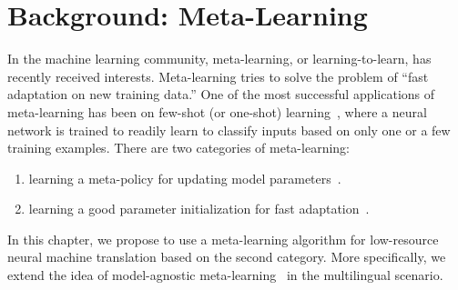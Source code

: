 \section{Background: Meta-Learning}






In the machine learning community, meta-learning, or learning-to-learn, has recently received interests. Meta-learning tries to solve the problem of “fast adaptation on new training data.”  One of the most successful applications of meta-learning has been on few-shot (or one-shot) learning~\citep{lake2015human}, where a neural network is trained to readily learn to classify inputs based on only one or a few training examples. There are two categories of meta-learning:
\begin{enumerate}
    \item learning a meta-policy for updating model parameters~\citep[see, e.g.,][]{andrychowicz2016learning,ha2016hypernetworks,mishra2017meta}.
    \item  learning a good parameter initialization for fast adaptation~\citep[see, e.g.,][]{finn2017model,vinyals2016matching,snell2017prototypical}. 
\end{enumerate}
In this chapter, we propose to use a meta-learning algorithm for low-resource neural machine translation based on the second category. More specifically, we extend the idea of model-agnostic meta-learning~\citep[MAML,][]{finn2017model} in the multilingual scenario.


